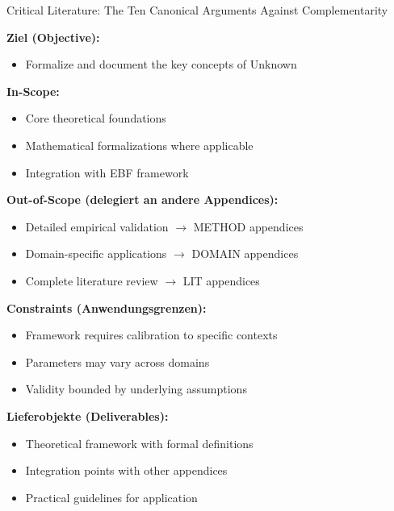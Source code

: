 \begin{chapter}{Critical Literature: The Ten Canonical Arguments Against Complementarity}
\begin{tcolorbox}[
    colback=orange!5!white,
    colframe=orange!75!black,
    title={\textbf{Appendix Scope: Ziel / In-Scope / Out-of-Scope / Constraints}},
    fonttitle=\bfseries
]

\textbf{Ziel (Objective):}
\begin{itemize}[nosep]
    \item Formalize and document the key concepts of Unknown
\end{itemize}

\textbf{In-Scope:}
\begin{itemize}[nosep]
    \item Core theoretical foundations
    \item Mathematical formalizations where applicable
    \item Integration with EBF framework
\end{itemize}

\textbf{Out-of-Scope (delegiert an andere Appendices):}
\begin{itemize}[nosep]
    \item Detailed empirical validation $\rightarrow$ METHOD appendices
    \item Domain-specific applications $\rightarrow$ DOMAIN appendices
    \item Complete literature review $\rightarrow$ LIT appendices
\end{itemize}

\textbf{Constraints (Anwendungsgrenzen):}
\begin{itemize}[nosep]
    \item Framework requires calibration to specific contexts
    \item Parameters may vary across domains
    \item Validity bounded by underlying assumptions
\end{itemize}

\textbf{Lieferobjekte (Deliverables):}
\begin{itemize}[nosep]
    \item Theoretical framework with formal definitions
    \item Integration points with other appendices
    \item Practical guidelines for application
\end{itemize}

\end{tcolorbox}


\end{chapter}
